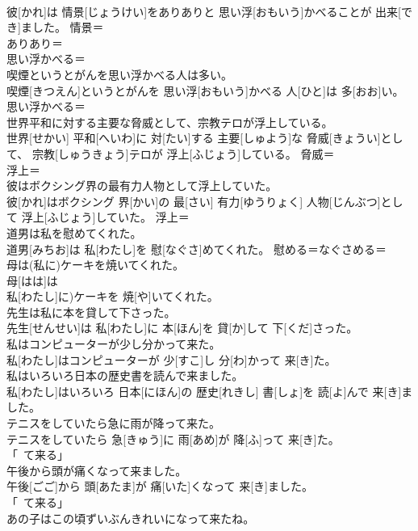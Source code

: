 \documentclass[8pt]{extreport}
\begin{document}
\begin{CJK}{UTF8}{min}
\\	彼[かれ]は 情景[じょうけい]をありありと 思い浮[おもいう]かべることが 出来[でき]ました。	情景＝ 
\\	ありあり＝ 
\\	思い浮かべる＝ 
\\	喫煙というとがんを思い浮かべる人は多い。	
\\	喫煙[きつえん]というとがんを 思い浮[おもいう]かべる 人[ひと]は 多[おお]い。	思い浮かべる＝ 
\\	世界平和に対する主要な脅威として、宗教テロが浮上している。	
\\	世界[せかい] 平和[へいわ]に 対[たい]する 主要[しゅよう]な 脅威[きょうい]として、 宗教[しゅうきょう]テロが 浮上[ふじょう]している。	脅威＝ 
\\	浮上＝ 
\\	彼はボクシング界の最有力人物として浮上していた。	
\\	彼[かれ]はボクシング 界[かい]の 最[さい] 有力[ゆうりょく] 人物[じんぶつ]として 浮上[ふじょう]していた。	浮上＝ 
\\	道男は私を慰めてくれた。	
\\	道男[みちお]は 私[わたし]を 慰[なぐさ]めてくれた。	慰める＝なぐさめる＝ 
\\	母は(私に)ケーキを焼いてくれた。	
\\	母[はは]は
\\	私[わたし]に)ケーキを 焼[や]いてくれた。	
\\	先生は私に本を貸して下さった。	
\\	先生[せんせい]は 私[わたし]に 本[ほん]を 貸[か]して 下[くだ]さった。	
\\	私はコンピューターが少し分かって来た。	
\\	私[わたし]はコンピューターが 少[すこ]し 分[わ]かって 来[き]た。	
\\	私はいろいろ日本の歴史書を読んで来ました。	
\\	私[わたし]はいろいろ 日本[にほん]の 歴史[れきし] 書[しょ]を 読[よ]んで 来[き]ました。	
\\	テニスをしていたら急に雨が降って来た。	
\\	テニスをしていたら 急[きゅう]に 雨[あめ]が 降[ふ]って 来[き]た。	
\\	「~て来る」
\\	午後から頭が痛くなって来ました。	
\\	午後[ごご]から 頭[あたま]が 痛[いた]くなって 来[き]ました。	
\\	「~て来る」
\\	あの子はこの頃ずいぶんきれいになって来たね。	

\end{CJK}
\end{document}
